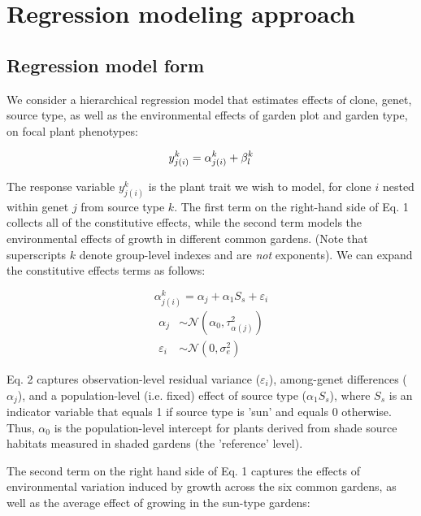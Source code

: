 \documentclass[11pt, oneside]{amsart}
\begin{document}
\clearpage

\section{Regression modeling approach}

\subsection{Regression model form}
We consider a hierarchical regression model that estimates effects of clone, genet, source type, as well as the environmental effects of garden plot and garden type, on focal plant phenotypes:

\begin{equation} \label{eq1}
y^{k}_{j(i)} = \alpha^{k}_{j(i)} + \beta^{k}_{l}\\
\end{equation}

The response variable $y^{k}_{j(i)}$ is the plant trait we wish to model, for clone $i$ nested within genet $j$ from source type $k$. The first term on the right-hand side of Eq. 1 collects all of the constitutive effects, while the second term models the environmental effects of growth in different common gardens. (Note that superscripts $k$ denote group-level indexes and are \emph{not} exponents). We can expand the constitutive effects terms as follows:

\begin{equation} \label{eq2}
\alpha^{k}_{j(i)} = \alpha_{j} + \alpha_{1}S_{s} + \varepsilon_{i}
\end{equation}
\begin{align*}
\alpha_{j} &\sim \mathcal{N}(\alpha_{0}, \tau^2_{\alpha(j)}) \\
\varepsilon_{i} &\sim \mathcal{N}(0, \sigma^{2}_{e})
\end{align*}

Eq. 2 captures observation-level residual variance ($\varepsilon_{i}$), among-genet differences ($\alpha_{j}$), and a population-level (i.e. fixed) effect of source type ($\alpha_{1}S_{s}$), where $S_{s}$ is an indicator variable that equals 1 if source type is 'sun' and equals 0 otherwise. Thus, $\alpha_0$ is the population-level intercept for plants derived from shade source habitats measured in shaded gardens (the 'reference' level).

The second term on the right hand side of Eq. 1 captures the effects of environmental variation induced by growth across the six common gardens, as well as the average effect of growing in the sun-type gardens:
\end{document}
